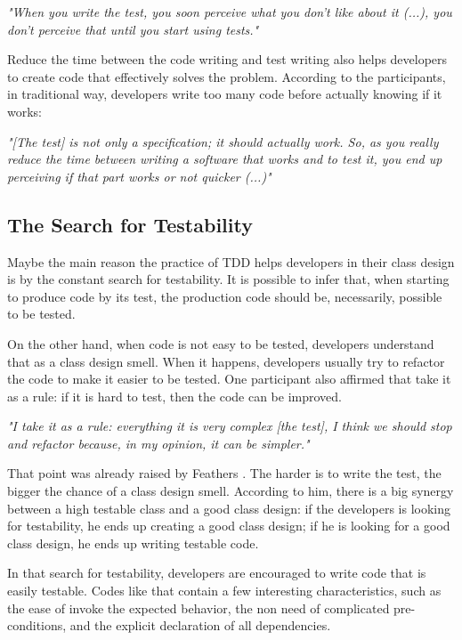 \documentclass[conference]{IEEEtran}
\begin{document}
\begin{framed}
	\textit{"When you write the test, you soon perceive what you don't like about it (...), 
	you don't perceive that until you start using tests."}

Reduce the time between the code writing and test writing also helps developers to
create code that effectively solves the problem. According to the participants, in traditional
way, developers write too many code before actually knowing if it works:

\begin{framed}
	\textit{"[The test] is not only a specification; it should actually work. So, as you really reduce
	the time between writing a software that works and to test it, you end up perceiving if that
	part works or not quicker (...)"}

\subsection{The Search for Testability}

Maybe the main reason the practice of TDD helps developers in their class design is
by the constant search for testability. It is possible to infer that,
when starting to produce code by its test, the production code should be, necessarily,
possible to be tested.

On the other hand, when code is not easy to be tested, developers understand that
as a class design smell. When it happens, developers usually try to refactor
the code to make it easier to be tested. One participant also affirmed that
take it as a rule: if it is hard to test, then the code can be improved.

\begin{framed}
	\textit{"I take it as a rule: everything it is very complex [the test],
	I think we should stop and refactor because, in my opinion, it can be simpler."}	
\end{framed}

That point was already raised by Feathers \cite{feathers-synergy}.
The harder is to write the test, the bigger the chance of a class design smell.
According to him, there is a big synergy between a high testable class and
a good class design: if the developers is looking for testability, he ends up
creating a good class design; if he is looking for a good class design, he ends
up writing testable code.

In that search for testability, developers are encouraged to write code
that is easily testable. Codes like that contain a few interesting
characteristics, such as the ease of invoke the expected behavior,
the non need of complicated pre-conditions, and the explicit declaration
of all dependencies.


\end{framed}
\end{framed}
\end{document}
